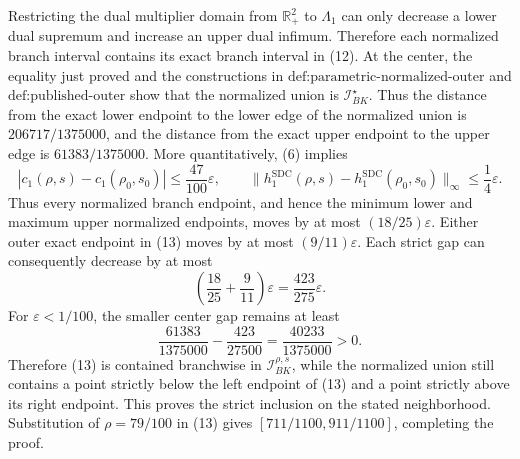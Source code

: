 Restricting the dual multiplier domain from \(\mathbb R_+^2\) to \(\Lambda_1\) can only decrease a lower dual supremum and increase an upper dual infimum.  Therefore each normalized branch interval contains its exact branch interval in (12).  At the center, the equality just proved and the constructions in \(\text{def:parametric-normalized-outer}\) and \(\text{def:published-outer}\) show that the normalized union is \(\mathcal I_{BK}^\star\).  Thus the distance from the exact lower endpoint to the lower edge of the normalized union is \(206717/1375000\), and the distance from the exact upper endpoint to the upper edge is \(61383/1375000\).  More quantitatively, (6) implies
\[
 |c_1(\rho,s)-c_1(\rho_0,s_0)|\leq\frac{47}{100}\varepsilon,
 \qquad
 \|h_1^{\mathrm{SDC}}(\rho,s)-h_1^{\mathrm{SDC}}(\rho_0,s_0)\|_\infty
 \leq\frac14\varepsilon.
\]
Thus every normalized branch endpoint, and hence the minimum lower and maximum upper normalized endpoints, moves by at most \((18/25)\varepsilon\).  Either outer exact endpoint in (13) moves by at most \((9/11)\varepsilon\).  Each strict gap can consequently decrease by at most
\[
 \left(\frac{18}{25}+\frac{9}{11}\right)\varepsilon
 =\frac{423}{275}\varepsilon.
\]
For \(\varepsilon<1/100\), the smaller center gap remains at least
\[
 \frac{61383}{1375000}-\frac{423}{27500}
 =\frac{40233}{1375000}>0.
\]
Therefore (13) is contained branchwise in \(\mathcal I_{BK}^{\rho,s}\), while the normalized union still contains a point strictly below the left endpoint of (13) and a point strictly above its right endpoint.  This proves the strict inclusion on the stated neighborhood.  Substitution of \(\rho=79/100\) in (13) gives \([711/1100,911/1100]\), completing the proof.
